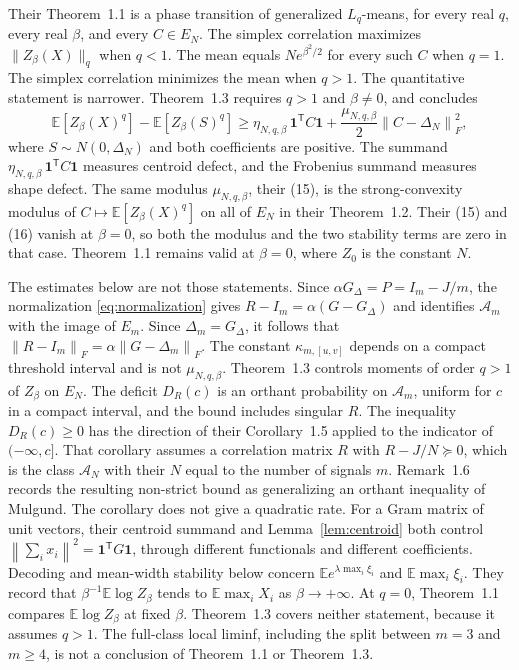 \documentclass[11pt]{article}
\theoremstyle{remark}\newtheorem{remark}[theorem]{Remark}
\newcommand{\E}{\mathbb E}
\newcommand{\one}{\mathbf 1}
\newcommand{\norm}[1]{\left\lVert#1\right\rVert}
\begin{document}
Their Theorem~1.1 is a phase transition of generalized $L_q$-means, for every
real $q$, every real $\beta$, and every $C\in E_N$. The simplex correlation
maximizes $\|Z_\beta(X)\|_q$ when $q<1$. The mean equals $N e^{\beta^2/2}$
for every such $C$ when $q=1$. The simplex correlation minimizes the mean
when $q>1$. The quantitative statement is narrower. Theorem~1.3 requires
$q>1$ and $\beta\neq 0$, and concludes
\[
 \E[Z_\beta(X)^q]-\E[Z_\beta(S)^q]
 \ge \eta_{N,q,\beta}\,\one^{\mathsf T}C\one
  +\frac{\mu_{N,q,\beta}}{2}\norm{C-\Delta_N}_F^2,
\]
where $S\sim N(0,\Delta_N)$ and both coefficients are positive. The summand
$\eta_{N,q,\beta}\,\one^{\mathsf T}C\one$ measures centroid defect, and the
Frobenius summand measures shape defect. The
same modulus $\mu_{N,q,\beta}$, their (15), is the strong-convexity modulus
of $C\mapsto\E[Z_\beta(X)^q]$ on all of $E_N$ in their Theorem~1.2. Their
(15) and (16) vanish at $\beta=0$, so both the modulus and the two stability
terms are zero in that case. Theorem~1.1 remains valid at $\beta=0$, where
$Z_0$ is the constant $N$.

The estimates below are not those statements. Since
$\alpha G_\Delta=P=I_m-J/m$, the normalization \eqref{eq:normalization} gives
$R-I_m=\alpha(G-G_\Delta)$ and identifies $\mathcal A_m$ with the image of
$E_m$. Since $\Delta_m=G_\Delta$, it follows that
$\norm{R-I_m}_F=\alpha\norm{G-\Delta_m}_F$. The constant
$\kappa_{m,[u,v]}$ depends on a compact threshold interval and is not
$\mu_{N,q,\beta}$. Theorem~1.3 controls moments of order $q>1$ of $Z_\beta$
on $E_N$. The deficit $D_R(c)$ is an orthant probability on $\mathcal A_m$,
uniform for $c$ in a compact interval, and the bound includes singular $R$.
The inequality $D_R(c)\ge 0$ has the direction of their Corollary~1.5 applied
to the indicator of $(-\infty,c]$. That corollary assumes a correlation
matrix $R$ with $R-J/N\succeq 0$, which is the class $\mathcal A_N$ with
their $N$ equal to the number of signals $m$. Remark~1.6 records the
resulting non-strict bound as generalizing an orthant inequality of Mulgund.
The corollary does not give a quadratic rate. For a Gram matrix of unit
vectors, their centroid summand and Lemma~\ref{lem:centroid} both control
$\norm{\sum_i x_i}^2=\one^{\mathsf T}G\one$, through different functionals
and different coefficients. Decoding and mean-width stability below concern
$\E e^{\lambda\max_i\xi_i}$ and $\E\max_i\xi_i$. They record that
$\beta^{-1}\E\log Z_\beta$ tends to $\E\max_i X_i$ as $\beta\to+\infty$. At
$q=0$, Theorem~1.1 compares $\E\log Z_\beta$ at fixed $\beta$. Theorem~1.3
covers neither statement, because it assumes $q>1$. The full-class local
liminf, including the split between $m=3$ and $m\ge 4$, is not a conclusion
of Theorem~1.1 or Theorem~1.3.
\end{document}
